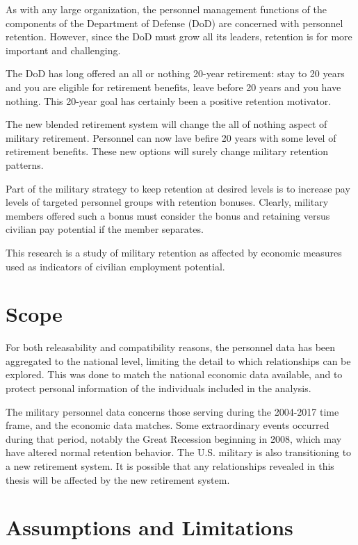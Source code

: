 \documentclass[12pt,letterpaper,toc=flat,oneside]{report}
\theoremstyle{definition}
\theoremstyle{definition}
\theoremstyle{definition}
\theoremstyle{remark}
\begin{document}
As with any large organization, the personnel management functions of
the components of the Department of Defense (DoD) are concerned with
personnel retention. However, since the DoD must grow all its leaders,
retention is for more important and challenging.

The DoD has long offered an all or nothing 20-year retirement: stay to
20 years and you are eligible for retirement benefits, leave before 20
years and you have nothing. This 20-year goal has certainly been a
positive retention motivator.

The new blended retirement system will change the all of nothing aspect
of military retirement. Personnel can now lave befire 20 years with some
level of retirement benefits. These new options will surely change
military retention patterns.

Part of the military strategy to keep retention at desired levels is to
increase pay levels of targeted personnel groups with retention bonuses.
Clearly, military members offered such a bonus must consider the bonus
and retaining versus civilian pay potential if the member separates.

This research is a study of military retention as affected by economic
measures used as indicators of civilian employment potential.

\hypertarget{scope}{%
\section{Scope}\label{scope}}

For both releasability and compatibility reasons, the personnel data has
been aggregated to the national level, limiting the detail to which
relationships can be explored. This was done to match the national
economic data available, and to protect personal information of the
individuals included in the analysis.

The military personnel data concerns those serving during the 2004-2017
time frame, and the economic data matches. Some extraordinary events
occurred during that period, notably the Great Recession beginning in
2008, which may have altered normal retention behavior. The U.S.
military is also transitioning to a new retirement system. It is
possible that any relationships revealed in this thesis will be affected
by the new retirement system.

\hypertarget{assumptions-and-limitations}{%
\section{Assumptions and
Limitations}\label{assumptions-and-limitations}}
\end{document}
